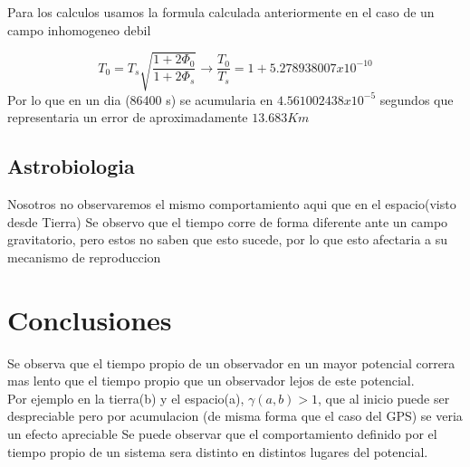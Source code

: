 \documentclass[12pt,twoside]{rif}
\begin{document}
Para los calculos usamos la formula calculada anteriormente en el caso de un campo inhomogeneo debil

\begin{equation}
T_{0}=T_{s}\sqrt{\frac{1+2\Phi_{0}}{1+2\Phi_{s}}}\to
\frac{T_{0}}{T_{s}}=1+5.278938007 x 10^{-10}
\end{equation}
Por lo que en un dia (86400 s) se acumularia en $4.561002438x10^{-5}$ segundos que representaria un error de aproximadamente $13.683 Km$

	\subsection{Astrobiologia}
	Nosotros no observaremos el mismo comportamiento aqui que en  el espacio(visto desde Tierra) Se observo que el tiempo corre de forma diferente ante un campo gravitatorio, pero estos no saben que esto sucede, por lo que esto afectaria a su mecanismo de reproduccion
	\section{Conclusiones}

Se observa que el tiempo propio de un observador en un mayor potencial correra mas lento que el tiempo propio que un observador lejos de este potencial.\\
Por ejemplo en la tierra(b) y el espacio(a), $\gamma(a,b)>1$, que al inicio puede ser despreciable pero por acumulacion (de misma forma que el caso del GPS) se veria un efecto apreciable
Se puede observar que el comportamiento definido por el tiempo propio de un sistema sera distinto en distintos lugares del potencial.
	\nocite{*}
	
	
	
\end{document}
